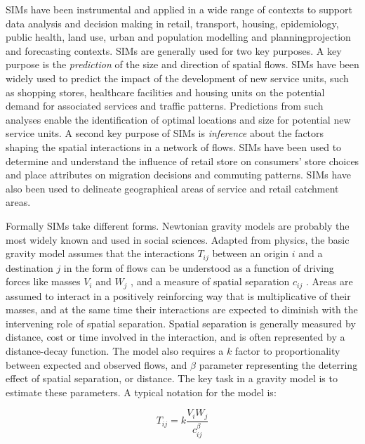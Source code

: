\documentclass[11pt,letterpaper]{article}
\begin{document}
SIMs have been instrumental and applied in a wide range of contexts to support data analysis and decision making in retail, transport, housing, epidemiology, public health, land use, urban and population modelling and planningprojection and forecasting contexts.
SIMs are generally used for two key purposes.
A key purpose is the \emph{prediction} of the size and direction of spatial flows.
SIMs have been widely used to predict the impact of the development of new service units, such as shopping stores, healthcare facilities and housing units on the potential demand for associated services and traffic patterns.
Predictions from such analyses enable the identification of optimal locations and size for potential new service units.
A second key purpose of SIMs is \emph{inference} about the factors shaping the spatial interactions in a network of flows.
SIMs have been used to determine and understand the influence of retail store on consumers' store choices and place attributes on migration decisions and commuting patterns.
SIMs have also been used to delineate geographical areas of service and retail catchment areas.

Formally SIMs take different forms.
Newtonian gravity models are probably the most widely known and used in social sciences.
Adapted from physics, the basic gravity model assumes that the interactions \(T_{i j}\) between an origin \(i\) and a destination \(j\) in the form of flows can be understood as a function of driving forces like masses \(V_{i}\) and \(W_{j}\) , and a measure of spatial separation \(c_{ij}\) .
Areas are assumed to interact in a positively reinforcing way that is multiplicative of their masses, and at the same time their interactions are expected to diminish with the intervening role of spatial separation.
Spatial separation is generally measured by distance, cost or time involved in the interaction, and is often represented by a distance-decay function.
The model also requires a \(k\) factor to proportionality between expected and observed flows, and \(\beta\) parameter representing the deterring effect of spatial separation, or distance.
The key task in a gravity model is to estimate these parameters.
A typical notation for the model is:

\[
T_{i j}=k \frac{V_{i} W_{j}}{c_{i j}^{\beta}}
\]
\end{document}
